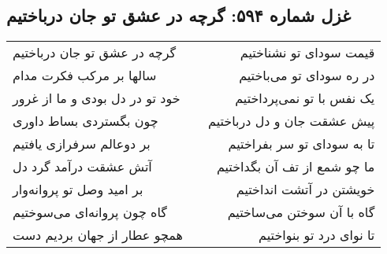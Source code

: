 \begin{center}
\section*{غزل شماره ۵۹۴: گرچه در عشق تو جان درباختیم}
\label{sec:594}
\begin{longtable}{l p{0.5cm} r}
گرچه در عشق تو جان درباختیم
&&
قیمت سودای تو نشناختیم
\\
سالها بر مرکب فکرت مدام
&&
در ره سودای تو می‌باختیم
\\
خود تو در دل بودی و ما از غرور
&&
یک نفس با تو نمی‌پرداختیم
\\
چون بگستردی بساط داوری
&&
پیش عشقت جان و دل درباختیم
\\
بر دوعالم سرفرازی یافتیم
&&
تا به سودای تو سر بفراختیم
\\
آتش عشقت درآمد گرد دل
&&
ما چو شمع از تف آن بگداختیم
\\
بر امید وصل تو پروانه‌وار
&&
خویشتن در آتشت انداختیم
\\
گاه چون پروانه‌ای می‌سوختیم
&&
گاه با آن سوختن می‌ساختیم
\\
همچو عطار از جهان بردیم دست
&&
تا نوای درد تو بنواختیم
\\
\end{longtable}
\end{center}
